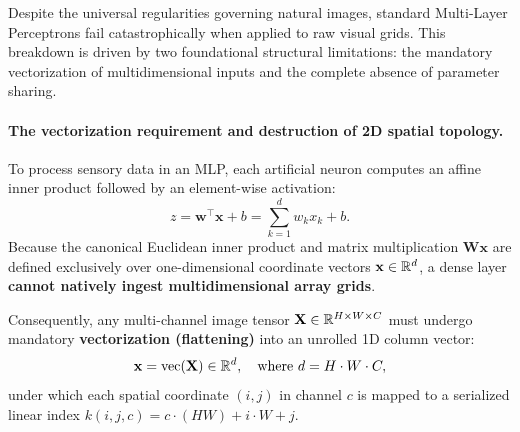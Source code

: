 Despite the universal regularities governing natural images, standard Multi-Layer Perceptrons fail catastrophically when applied to raw visual grids. This breakdown is driven by two foundational structural limitations: the mandatory vectorization of multidimensional inputs and the complete absence of parameter sharing.

\paragraph{The vectorization requirement and destruction of 2D spatial topology.}
To process sensory data in an MLP, each artificial neuron computes an affine inner product followed by an element-wise activation:
\begin{equation}
z = \mathbf{w}^\top \mathbf{x} + b = \sum_{k=1}^d w_k x_k + b.
\end{equation}
Because the canonical Euclidean inner product and matrix multiplication $\mathbf{W}\mathbf{x}$ are defined exclusively over one-dimensional coordinate vectors $\mathbf{x} \in \mathbb{R}^d$, a dense layer \textbf{cannot natively ingest multidimensional array grids}.

Consequently, any multi-channel image tensor $\mathbf{X} \in \mathbb{R}^{H \times W \times C}$ must undergo mandatory \textbf{vectorization (flattening)} into an unrolled 1D column vector:
\begin{equation}
\mathbf{x} = \operatorname{vec}(\mathbf{X}) \in \mathbb{R}^{d}, \quad \text{where } d = H \cdot W \cdot C,
\label{eq:flattening_transformation}
\end{equation}
under which each spatial coordinate $(i, j)$ in channel $c$ is mapped to a serialized linear index $k(i, j, c) = c \cdot (HW) + i \cdot W + j$.

